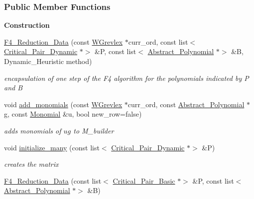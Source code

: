 \subsubsection*{Public Member Functions}
\begin{Indent}\textbf{ Construction}\par
\begin{DoxyCompactItemize}
\item 
\hyperlink{group___g_b_computation_a41791d20f96fc7310a40a8e4c63aa4ef}{F4\+\_\+\+Reduction\+\_\+\+Data} (const \hyperlink{group__orderinggroup_class_w_grevlex}{W\+Grevlex} $\ast$curr\+\_\+ord, const list$<$ \hyperlink{group___g_b_computation_class_critical___pair___dynamic}{Critical\+\_\+\+Pair\+\_\+\+Dynamic} $\ast$$>$ \&P, const list$<$ \hyperlink{group__polygroup_class_abstract___polynomial}{Abstract\+\_\+\+Polynomial} $\ast$$>$ \&B, Dynamic\+\_\+\+Heuristic method)
\begin{DoxyCompactList}\small\item\em encapsulation of one step of the F4 algorithm for the polynomials indicated by {\ttfamily P} and {\ttfamily B} \end{DoxyCompactList}\item 
void \hyperlink{group___g_b_computation_aa73909179732a3e0e4290c69cf992ddf}{add\+\_\+monomials} (const \hyperlink{group__orderinggroup_class_w_grevlex}{W\+Grevlex} $\ast$curr\+\_\+ord, const \hyperlink{group__polygroup_class_abstract___polynomial}{Abstract\+\_\+\+Polynomial} $\ast$g, const \hyperlink{group__polygroup_class_monomial}{Monomial} \&u, bool new\+\_\+row=false)
\begin{DoxyCompactList}\small\item\em adds monomials of $ ug $ to {\ttfamily M\+\_\+builder} \end{DoxyCompactList}\item 
void \hyperlink{group___g_b_computation_a9fa6a212375b9498ca86a2c18e94ca1e}{initialize\+\_\+many} (const list$<$ \hyperlink{group___g_b_computation_class_critical___pair___dynamic}{Critical\+\_\+\+Pair\+\_\+\+Dynamic} $\ast$$>$ \&P)
\begin{DoxyCompactList}\small\item\em creates the matrix \end{DoxyCompactList}\item 
\hyperlink{group___g_b_computation_ada9c61c0f75be4a2b3dd5c762c1c9a1b}{F4\+\_\+\+Reduction\+\_\+\+Data} (const list$<$ \hyperlink{group___g_b_computation_class_critical___pair___basic}{Critical\+\_\+\+Pair\+\_\+\+Basic} $\ast$$>$ \&P, const list$<$ \hyperlink{group__polygroup_class_abstract___polynomial}{Abstract\+\_\+\+Polynomial} $\ast$$>$ \&B)
$$
\end{DoxyCompactItemize}
\end{Indent}

